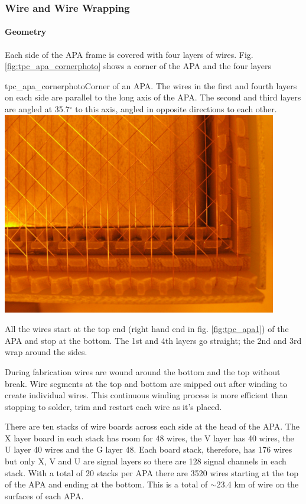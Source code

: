 \subsubsection{Wire and Wire Wrapping}

\paragraph{Geometry}

Each side of the APA frame is covered with four layers of wires.  Fig. \ref{fig:tpc_apa_cornerphoto} shows a corner of the APA and the four layers

\begin{cdrfigure}{tpc_apa_cornerphoto}{Corner of an APA.  The wires in the first and fourth layers on each side are parallel to the long axis of the APA.  The second and third layers are angled at 35.7$^{\circ}$ to this axis, angled in opposite directions to each other.}
\includegraphics[width=0.9\textwidth]{figures/tpc_apa_cornerphoto.png} 
\end{cdrfigure}

All the wires start at the top end (right hand end in fig. \ref{fig:tpc_apa1}) of the APA and stop at the bottom. The 1st and 4th layers go straight; the 2nd and 3rd wrap around the sides.

During fabrication wires are wound around the bottom and the top without break.  Wire segments at the top and bottom are snipped out after winding to create individual wires.  This continuous winding process is more efficient than stopping to solder, trim and restart each wire as it's placed.

There are ten stacks of wire boards across each side at the head of the APA.  The X layer board in each stack has room for 48 wires, the V layer has 40 wires, the U layer 40 wires and the G layer 48.  Each board stack, therefore, has 176 wires but only X, V and U are signal layers so there are 128 signal channels in each stack.  With a total of 20 stacks per APA there are 3520 wires starting at the top of the APA and ending at the bottom.  This is a total of $\sim$23.4 km of wire on the surfaces of each APA.

